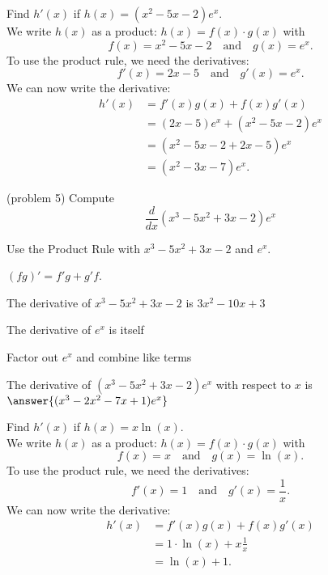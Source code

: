\documentclass[handout]{ximera}
\begin{document}
\begin{example}[example 5]
Find $h'(x)$ if $h(x) = (x^2 - 5x - 2)e^x$.\\
We write $h(x)$ as a product: $h(x) = f(x) \cdot g(x)$ with
\[f(x) = x^2 - 5x -2 \quad \text{and} \quad g(x) = e^x.\]
To use the product rule, we need the derivatives:
\[f'(x) = 2x - 5 \quad \text{and} \quad g'(x)= e^x.\]
We can now write the derivative:
\begin{align*}
h'(x) &= f'(x)g(x) + f(x)g'(x) \\
&= (2x - 5)e^x+ (x^2 - 5x - 2)e^x  \\
&= (x^2 - 5x - 2 + 2x - 5)e^x \\
&= (x^2 - 3x - 7)e^x.
\end{align*}
\end{example}


\begin{center}
\begin{foldable}
\end{foldable}
\end{center}


\begin{problem}(problem 5)
  Compute
  \[
  \frac{d}{dx} (x^3 - 5x^2 + 3x -2)e^x
  \]
  
    \begin{hint}
      Use the Product Rule with $x^3 - 5x^2 + 3x -2$ and $e^x$.
    \end{hint}
    \begin{hint}
      $(fg)' = f'g+g'f$.
    \end{hint}
    \begin{hint}
      The derivative of $x^3 - 5x^2 + 3x -2$ is $3x^2 - 10x + 3$
    \end{hint}
    \begin{hint}
      The derivative of $e^x$ is itself
    \end{hint}
    \begin{hint}
      Factor out $e^x$ and combine like terms 
    \end{hint}
		The derivative of $(x^3 - 5x^2 + 3x -2)e^x$ with respect to $x$ is
		 $\answer{(x^3 - 2x^2 - 7x +1)e^x}$
		
\end{problem}




\begin{example}[example 6]
Find $h'(x)$ if $h(x) = x\ln(x)$.\\
We write $h(x)$ as a product: $h(x) = f(x) \cdot g(x)$ with
\[f(x) = x \quad \text{and} \quad g(x) = \ln(x).\]
To use the product rule, we need the derivatives:
\[f'(x) = 1 \quad \text{and} \quad g'(x)= \frac{1}{x}.\]
We can now write the derivative:
\begin{align*}
h'(x) &= f'(x)g(x) + f(x)g'(x) \\
&=  1 \cdot \ln(x) + x\frac{1}{x}  \\
&=  \ln(x) + 1.
\end{align*}
\end{example}
\end{document}
